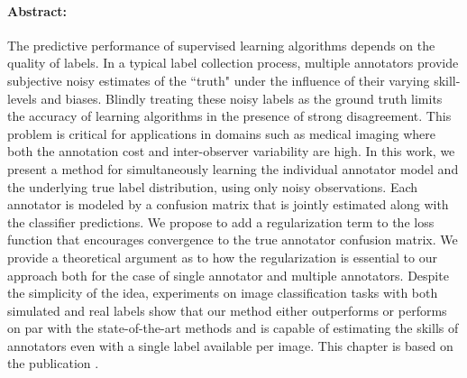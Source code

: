 
\paragraph{Abstract: }
The predictive performance of supervised learning algorithms depends on the quality of labels. In a typical label collection process, multiple annotators provide subjective noisy estimates of the ``truth" under the influence of their varying skill-levels and biases. Blindly treating these noisy labels as the ground truth limits the accuracy of learning algorithms in the presence of strong disagreement. This problem is critical for applications in domains such as medical imaging where both the annotation cost and inter-observer variability are high. In this work, we present a method for simultaneously learning the individual annotator model and the underlying true label distribution, using only noisy observations. Each annotator is modeled by a confusion matrix that is jointly estimated along with the classifier predictions. We propose to add a regularization term to the loss function that encourages convergence to the true annotator confusion matrix. We provide a theoretical argument as to how the regularization is essential to our approach both for the case of single annotator and multiple annotators. Despite the simplicity of the idea, experiments on image classification tasks with both simulated and real labels show that our method either outperforms or performs on par with the state-of-the-art methods and is capable of estimating the skills of annotators even with a single label available per image. This chapter is based on the publication \cite{tanno2019learning}. 
 


